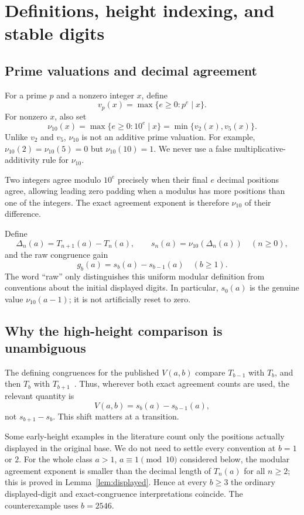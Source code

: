 \documentclass[11pt,a4paper]{article}
\theoremstyle{definition}
\theoremstyle{remark}
\begin{document}
\section{Definitions, height indexing, and stable digits}
\label{sec:definitions}

\subsection{Prime valuations and decimal agreement}
For a prime $p$ and a nonzero integer $x$, define
\[
 v_p(x)=\max\{e\ge0:p^e\mid x\}.
\]
For nonzero $x$, also set
\begin{equation}\label{eq:nu10}
 \nu_{10}(x)=\max\{e\ge0:10^e\mid x\}
 =\min\{v_2(x),v_5(x)\}.
\end{equation}
Unlike $v_2$ and $v_5$, $\nu_{10}$ is not an additive prime valuation. For example, $\nu_{10}(2)=\nu_{10}(5)=0$ but $\nu_{10}(10)=1$. We never use a false multiplicative-additivity rule for $\nu_{10}$.

Two integers agree modulo $10^e$ precisely when their final $e$ decimal positions agree, allowing leading zero padding when a modulus has more positions than one of the integers. The exact agreement exponent is therefore $\nu_{10}$ of their difference.

Define
\begin{equation}\label{eq:delta}
 \Delta_n(a)=T_{n+1}(a)-T_n(a),\qquad
 s_n(a)=\nu_{10}(\Delta_n(a))\quad(n\ge0),
\end{equation}
and the raw congruence gain
\begin{equation}\label{eq:gain}
 g_b(a)=s_b(a)-s_{b-1}(a)\quad(b\ge1).
\end{equation}
The word ``raw'' only distinguishes this uniform modular definition from conventions about the initial displayed digits. In particular, $s_0(a)$ is the genuine value $\nu_{10}(a-1)$; it is not artificially reset to zero.

\subsection{Why the high-height comparison is unambiguous}
The defining congruences for the published $V(a,b)$ compare $T_{b-1}$ with $T_b$, and then $T_b$ with $T_{b+1}$~\cite[Definition~1]{Ripa2021}. Thus, wherever both exact agreement counts are used, the relevant quantity is
\[
 V(a,b)=s_b(a)-s_{b-1}(a),
\]
not $s_{b+1}-s_b$. This shift matters at a transition.

Some early-height examples in the literature count only the positions actually displayed in the original base. We do not need to settle every convention at $b=1$ or $2$. For the whole class $a>1$, $a\equiv1\pmod{10}$ considered below, the modular agreement exponent is smaller than the decimal length of $T_n(a)$ for all $n\ge2$; this is proved in Lemma~\ref{lem:displayed}. Hence at every $b\ge3$ the ordinary displayed-digit and exact-congruence interpretations coincide. The counterexample uses $b=2546$.
\end{document}
